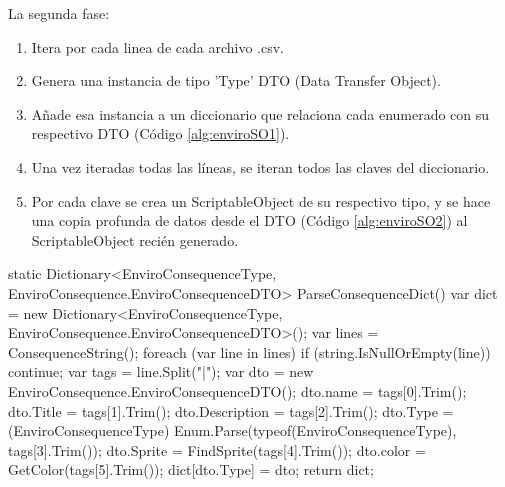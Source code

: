 La segunda fase:
\begin{enumerate}
    \item Itera por cada linea de cada archivo .csv.
    \item Genera una instancia de tipo 'Type' DTO (Data Transfer Object).
    \item Añade esa instancia a un diccionario que relaciona cada enumerado con su respectivo DTO (Código \ref{alg:enviroSO1}). 
    \item Una vez iteradas todas las líneas, se iteran todos las claves del diccionario.
    \item Por cada clave se crea un ScriptableObject de su respectivo tipo, y se hace una copia profunda de datos desde el DTO (Código \ref{alg:enviroSO2}) al ScriptableObject recién generado.
\end{enumerate} 

\begin{mypython}[caption={Código para autogenerar DTOs de tipo EnviroConsequences.},label={alg:enviroSO1}]
static Dictionary<EnviroConsequenceType, EnviroConsequence.EnviroConsequenceDTO> ParseConsequenceDict()
{
    var dict = new Dictionary<EnviroConsequenceType, EnviroConsequence.EnviroConsequenceDTO>();
    var lines = ConsequenceString();
    foreach (var line in lines)
    {
        if (string.IsNullOrEmpty(line))
            continue;
        var tags = line.Split("|");
        var dto = new EnviroConsequence.EnviroConsequenceDTO();
        dto.name = tags[0].Trim();
        dto.Title = tags[1].Trim();
        dto.Description = tags[2].Trim();
        dto.Type = (EnviroConsequenceType) Enum.Parse(typeof(EnviroConsequenceType), tags[3].Trim());
        dto.Sprite = FindSprite(tags[4].Trim());
        dto.color = GetColor(tags[5].Trim());
        dict[dto.Type] = dto;
    }
    return dict;
}
\end{mypython}

